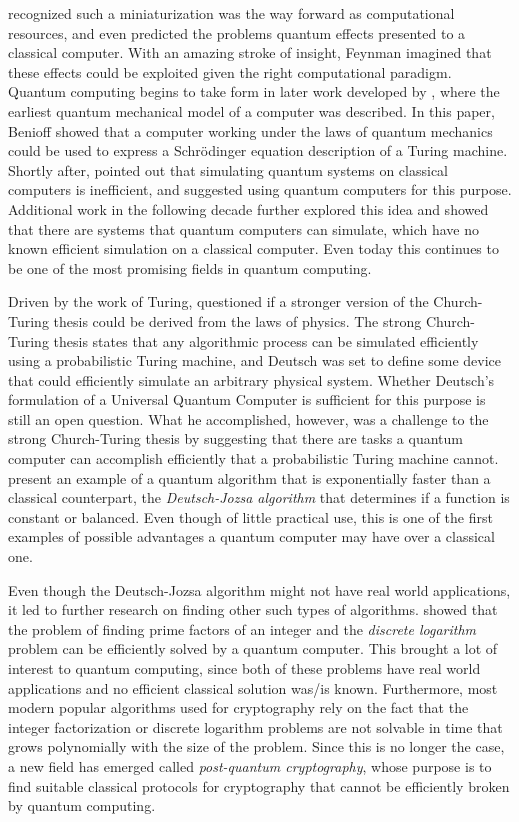 \documentclass[../../dissertation.tex]{subfiles}
\begin{document}
\cite{feynman1959} recognized such a miniaturization was the way forward as computational resources, and
even predicted the problems quantum effects presented to a classical computer.
With an amazing stroke of insight, Feynman imagined that these effects could
be exploited given the right computational paradigm. Quantum computing begins
to take form in later work developed by \cite{benioff1980}, where the earliest
quantum mechanical model of a computer was described. In this paper, Benioff
showed that a computer working under the laws of quantum mechanics could be
used to express a Schrödinger equation description of a Turing machine. Shortly
after, \cite{feynman1982} pointed out that simulating quantum systems on
classical computers is inefficient, and suggested using quantum computers for
this purpose. Additional work in the following decade further explored this
idea and showed that there are systems that quantum computers can simulate,
which have no known efficient simulation on a classical computer. Even
today this continues to be one of the most promising fields in quantum
computing.\par Driven by the work of Turing, \cite{deutsch1985} questioned if a
stronger version of the Church-Turing thesis could be derived from the laws of
physics. The strong Church-Turing thesis states that any algorithmic process
can be simulated efficiently using a probabilistic Turing machine, and Deutsch
was set to define some device that could efficiently simulate an arbitrary
physical system. Whether Deutsch's formulation of a Universal Quantum Computer
is sufficient for this purpose is still an open question. What he
accomplished, however, was a challenge to the strong Church-Turing thesis by suggesting
that there are tasks a quantum computer can accomplish efficiently that a
probabilistic Turing machine cannot. \cite{deutsch1992} present an example of a
quantum algorithm that is exponentially faster than a classical counterpart,
the \textit{Deutsch-Jozsa algorithm} that determines if a function is constant
or balanced. Even though of little practical use, this is one of the first
examples of possible advantages a quantum computer may have over a classical
one.\par

Even though the Deutsch-Jozsa algorithm might not have real world applications,
it led to further research on finding other such types of algorithms.
\cite{shor1994} showed that the problem of finding prime factors of an integer
and the \textit{discrete logarithm} problem can be efficiently solved by a
quantum computer. This brought a lot of interest to
quantum computing, since both of these problems have real world applications
and no efficient classical solution was/is known. Furthermore, most modern
popular algorithms used for cryptography rely on the fact that the integer
factorization or discrete logarithm problems are not solvable in time that grows polynomially with the size of the problem. Since
this is no longer the case, a new field has emerged called \textit{post-quantum
cryptography}, whose purpose is to find suitable classical protocols for
cryptography that cannot be efficiently broken by quantum computing.\par
\end{document}
